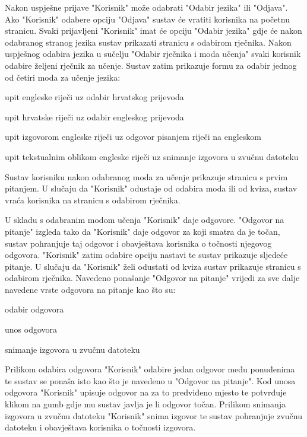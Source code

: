 Nakon uspješne prijave "Korisnik" može odabrati "Odabir jezika" ili "Odjava".
Ako "Korisnik" odabere opciju "Odjava" sustav će vratiti korisnika na početnu stranicu. Svaki prijavljeni "Korisnik" imat će opciju "Odabir jezika" gdje će nakon odabranog stranog jezika sustav prikazati stranicu s odabirom rječnika.
Nakon uspješnog odabira jezika u sučelju "Odabir rječnika i moda učenja" svaki korisnik odabire željeni rječnik za učenje. Sustav zatim prikazuje formu za odabir jednog od četiri moda za učenje jezika: 

\begin{packed_item}
	\item  upit engleske riječi uz odabir hrvatskog prijevoda
	\item  upit hrvatske riječi uz odabir engleskog prijevoda
	\item  upit izgovorom engleske riječi uz odgovor pisanjem riječi na engleskom
	\item  upit tekstualnim oblikom engleske riječi uz snimanje izgovora u zvučnu datoteku
\end{packed_item}

Sustav korisniku nakon odabranog moda za učenje prikazuje stranicu s prvim pitanjem. U slučaju da "Korisnik" odustaje od odabira moda ili od kviza, sustav vraća korisnika na stranicu s odabirom rječnika.

U skladu s odabranim modom učenja "Korisnik" daje odgovore. "Odgovor na pitanje" izgleda tako da "Korisnik" daje odgovor za koji smatra da je točan, sustav pohranjuje taj odgovor i obavještava korisnika o točnosti njegovog odgovora. "Korisnik" zatim odabire opciju nastavi te sustav prikazuje sljedeće pitanje. U slučaju da "Korisnik" želi odustati od kviza sustav prikazuje stranicu s odabirom rječnika. Navedeno ponašanje "Odgovor na pitanje" vrijedi za sve dalje navedene vrste odgovora na pitanje kao što su:

\begin{packed_item}
	\item  odabir odgovora
	\item  unos odgovora
	\item  snimanje izgovora u zvučnu datoteku
\end{packed_item}

Prilikom odabira odgovora "Korisnik" odabire jedan odgovor među ponuđenima te sustav se ponaša isto kao što je navedeno u "Odgovor na pitanje". Kod unosa odgovora "Korisnik" upisuje odgovor na za to predviđeno mjesto te potvrđuje klikom na gumb gdje mu sustav javlja je li odgovor točan. Prilikom snimanja izgovora u zvučnu datoteku "Korisnik" snima izgovor te sustav pohranjuje zvučnu datoteku i obavještava korisnika o točnosti izgovora.

